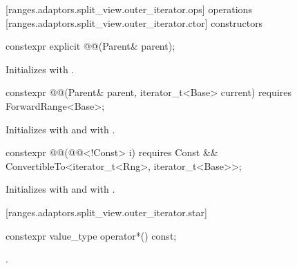 [ranges.adaptors.split_view.outer_iterator.ops]{ operations}
[ranges.adaptors.split_view.outer_iterator.ctor]{ constructors}

%
\begin{itemdecl}
constexpr explicit @@(Parent& parent);
\end{itemdecl}

\begin{itemdescr}
\pnum
\effects Initializes  with .
\end{itemdescr}

%
\begin{itemdecl}
constexpr @@(Parent& parent, iterator_t<Base> current)
  requires ForwardRange<Base>;
\end{itemdecl}

\begin{itemdescr}
\pnum
\effects Initializes  with  and 
with .
\end{itemdescr}

%
\begin{itemdecl}
constexpr @@(@@<!Const> i) requires Const &&
ConvertibleTo<iterator_t<Rng>, iterator_t<Base>>;
\end{itemdecl}

\begin{itemdescr}
\pnum
\effects Initializes  with  and 
with .
\end{itemdescr}

[ranges.adaptors.split_view.outer_iterator.star]{}

%
\begin{itemdecl}
constexpr value_type operator*() const;
\end{itemdecl}

\begin{itemdescr}
\pnum
\returns {}.
\end{itemdescr}

